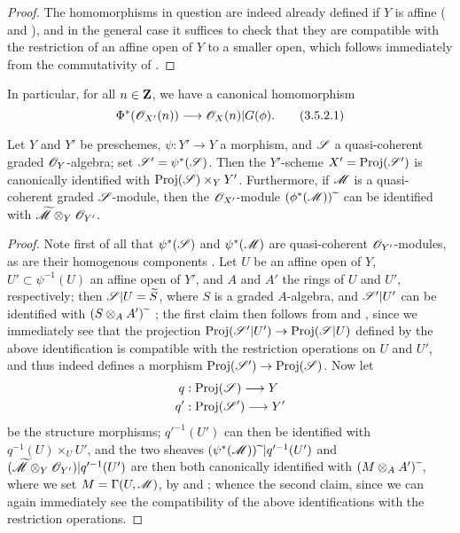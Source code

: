 \begin{proof}
The homomorphisms in question are indeed already defined if $Y$ is affine ( and ), and in the general case it suffices to check that they are compatible with the restriction of an affine open of $Y$ to a smaller open, which follows immediately from the commutativity of .
\end{proof}

In particular, for all $n\in\mathbf{Z}$, we have a canonical homomorphism
\[
\label{II.3.5.2.1}
  \Phi^*(\sh{O}_{X'}(n)) \to \sh{O}_X(n)|G(\vphi).
\tag{3.5.2.1}
\]

\begin{proposition}[3.5.3]
\label{II.3.5.3}
Let $Y$ and $Y'$ be preschemes, $\psi:Y'\to Y$ a morphism, and $\mathscr{S}$ a quasi-coherent graded $\mathscr{O}_Y$-algebra;
set $\mathscr{S}'=\psi^*(\mathscr{S})$.
Then the $Y'$-scheme $X'=\operatorname{Proj}(\mathscr{S}')$ is canonically identified with $\operatorname{Proj}(\mathscr{S})\times_Y Y'$.
Furthermore, if $\mathscr{M}$ is a quasi-coherent graded $\mathscr{S}$-module, then the $\mathscr{O}_{X'}$-module $(\phi^*(\mathscr{M})){\,\widetilde{\,}\,}$ can be identified with $\widetilde{\mathscr{M}}\otimes_Y\mathscr{O}_{Y'}$.
\end{proposition}

\begin{proof}
Note first of all that $\psi^*(\mathscr{S})$ and $\psi^*(\mathscr{M})$ are quasi-coherent $\mathscr{O}_{Y'}$-modules, as are their homogenous components .
Let $U$ be an affine open of $Y$, $U'\subset\psi^{-1}(U)$ an affine open of $Y'$, and $A$ and $A'$ the rings of $U$ and $U'$, respectively;
then $\mathscr{S}|U=\widetilde{S}$, where $S$ is a graded $A$-algebra, and $\mathscr{S}'|U'$ can be identified with $(S\otimes_A A'){\,\widetilde{\,}\,}$ ;
the first claim then follows from  and , since we immediately see that the projection $\Proj(\sh{S}'|U')\to\Proj(\sh{S}|U)$ defined by the above identification is compatible with the restriction operations on $U$ and $U'$, and thus indeed defines a morphism $\Proj(\sh{S}')\to\Proj(\sh{S})$.
Now let
\begin{align*}
  q &: \Proj(\sh{S}) \to Y
\\q'&: \Proj(\sh{S}') \to Y'
\end{align*}
be the structure morphisms;
$q'^{-1}(U')$ can then be identified with $q^{-1}(U)\times_U U'$, and the two sheaves $(\psi^*(\mathscr{M})){\,\widetilde{\,}\,}|q'^{-1}(U')$ and $(\widetilde{\mathscr{M}}\otimes_Y\mathscr{O}_{Y'})|q'^{-1}(U')$ are then both canonically identified with $(M\otimes_A A'){\,\widetilde{\,}\,}$, where we set $M=\Gamma(U,\mathscr{M})$, by  and ;
whence the second claim, since we can again immediately see the compatibility of the above identifications with the restriction operations.
\end{proof}

